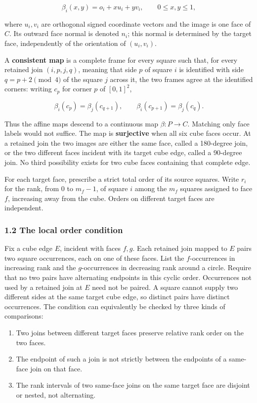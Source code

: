 \documentclass[
  11pt,
]{article}
\providecommand{\tightlist}{%
  \setlength{\itemsep}{0pt}\setlength{\parskip}{0pt}}
\begin{document}
\[
\beta_i(x,y)=o_i+x u_i+y v_i,
\qquad 0\leq x,y\leq1,
\]

where \(u_i,v_i\) are orthogonal signed coordinate vectors and the image
is one face of \(C\). Its outward face normal is denoted \(n_i\); this
normal is determined by the target face, independently of the
orientation of \((u_i,v_i)\).

A \textbf{consistent map} is a complete frame for every square such
that, for every retained join \((i,p,j,q)\), meaning that side \(p\) of
square \(i\) is identified with side \(q=p+2\pmod4\) of the square \(j\)
across it, the two frames agree at the identified corners: writing
\(c_p\) for corner \(p\) of \([0,1]^2\),

\[
\beta_i(c_p)=\beta_j(c_{q+1}),\qquad
\beta_i(c_{p+1})=\beta_j(c_q).
\]

Thus the affine maps descend to a continuous map \(\beta:P\to C\).
Matching only face labels would not suffice. The map is
\textbf{surjective} when all six cube faces occur. At a retained join
the two images are either the same face, called a 180-degree join, or
the two different faces incident with its target cube edge, called a
90-degree join. No third possibility exists for two cube faces
containing that complete edge.

For each target face, prescribe a strict total order of its source
squares. Write \(r_i\) for the rank, from \(0\) to \(m_f-1\), of square
\(i\) among the \(m_f\) squares assigned to face \(f\), increasing away
from the cube. Orders on different target faces are independent.

\subsubsection{1.2 The local order
condition}\label{the-local-order-condition}

Fix a cube edge \(E\), incident with faces \(f,g\). Each retained join
mapped to \(E\) pairs two square occurrences, each on one of these
faces. List the \(f\)-occurrences in increasing rank and the
\(g\)-occurrences in decreasing rank around a circle. Require that no
two pairs have alternating endpoints in this cyclic order. Occurrences
not used by a retained join at \(E\) need not be paired. A square cannot
supply two different sides at the same target cube edge, so distinct
pairs have distinct occurrences. The condition can equivalently be
checked by three kinds of comparisons:

\begin{enumerate}
\def\labelenumi{\arabic{enumi}.}
\tightlist
\item
  Two joins between different target faces preserve relative rank order
  on the two faces.
\item
  The endpoint of such a join is not strictly between the endpoints of a
  same-face join on that face.
\item
  The rank intervals of two same-face joins on the same target face are
  disjoint or nested, not alternating.
\end{enumerate}
\end{document}
